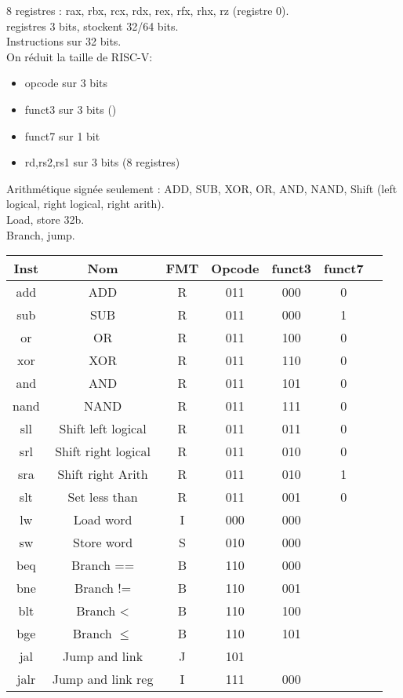 \documentclass[a4paper]{article}
\begin{document}
    8 registres : rax, rbx, rcx, rdx, rex, rfx, rhx, rz (registre 0).\\
    registres 3 bits, stockent 32/64 bits.\\
    Instructions sur 32 bits.\\
    On réduit la taille de RISC-V:\begin{itemize}
        \item opcode sur 3 bits
        \item funct3 sur 3 bits ()
        \item funct7 sur 1 bit 
        \item rd,rs2,rs1 sur 3 bits (8 registres)
    \end{itemize}
    Arithmétique signée seulement : ADD, SUB, XOR, OR, AND, NAND, Shift (left logical, right logical, right arith).\\
    Load, store 32b.\\
    Branch, jump.\\
    \begin{tabular}{|c|c|c|c|c|c|c|}
        \hline
        Inst & Nom                  & FMT & Opcode & funct3 & funct7 \\
        \hline
        add  & ADD                  & R   & 011    & 000    & 0      \\
        sub  & SUB                  & R   & 011    & 000    & 1      \\
        or   & OR                   & R   & 011    & 100    & 0      \\
        xor  & XOR                  & R   & 011    & 110    & 0      \\
        and  & AND                  & R   & 011    & 101    & 0      \\
        nand & NAND                 & R   & 011    & 111    & 0      \\
        sll  & Shift left logical   & R   & 011    & 011    & 0      \\
        srl  & Shift right logical  & R   & 011    & 010    & 0      \\
        sra  & Shift right Arith    & R   & 011    & 010    & 1      \\
        slt  & Set less than        & R   & 011    & 001    & 0      \\
        \hline
        lw   & Load word            & I   & 000    & 000    &        \\
        sw   & Store word           & S   & 010    & 000    &        \\
        \hline
        beq  & Branch ==            & B   & 110    & 000    &        \\
        bne  & Branch !=            & B   & 110    & 001    &        \\
        blt  & Branch <             & B   & 110    & 100    &        \\
        bge  & Branch \(\leqslant\) & B   & 110    & 101    &        \\
        \hline
        jal  & Jump and link        & J   & 101    &        &        \\
        jalr & Jump and link reg    & I   & 111    & 000    &        \\
        \hline
    \end{tabular}
\end{document}
